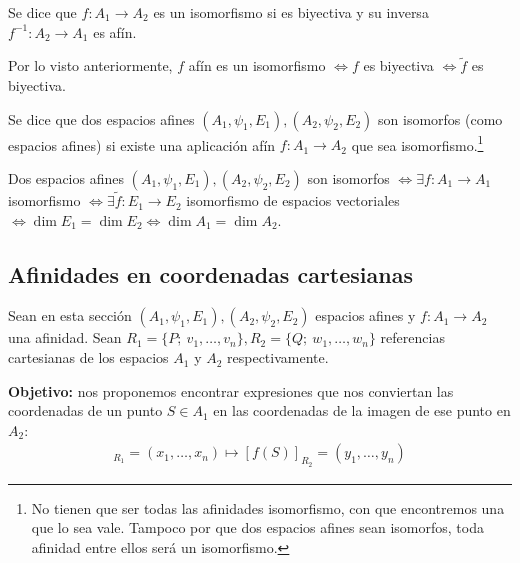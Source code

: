 \documentclass[14pt]{book}
\begin{document}
\begin{dfn}
	Se dice que $f : A_1 \to A_2$ es un isomorfismo si es biyectiva y su inversa $f^{-1} : A_2 \to A_1$ es afín.
\end{dfn}

\begin{tm}
	Por lo visto anteriormente, $f$ afín es un isomorfismo $\iff f$ es biyectiva $\iff \tilde{f}$ es biyectiva.
\end{tm}

\begin{dfn}
	Se dice que dos espacios afines $(A_1, \psi_1, E_1), (A_2, \psi_2, E_2)$ son isomorfos (como espacios afines) si existe una aplicación afín $f: A_1 \to A_2$ que sea isomorfismo.\footnote{No tienen que ser todas las afinidades isomorfismo, con que encontremos una que lo sea vale. Tampoco por que dos espacios afines sean isomorfos, toda afinidad entre ellos será un isomorfismo.}
\end{dfn}

\begin{tm}
	Dos espacios afines $(A_1, \psi_1, E_1), (A_2, \psi_2, E_2)$ son isomorfos $\iff \exists f : A_1 \to A_1$ isomorfismo $\iff \exists \tilde{f} : E_1 \to E_2$ isomorfismo de espacios vectoriales $\iff \dim E_1 = \dim E_2 \iff \dim A_1 = \dim A_2$.
\end{tm}

\subsection{Afinidades en coordenadas cartesianas}
Sean en esta sección $(A_1, \psi_1, E_1), (A_2, \psi_2, E_2)$ espacios afines y $f : A_1 \to A_2$ una afinidad. Sean $R_1 = \{P;\ v_1, \dots, v_n\}, R_2 = \{Q;\ w_1, \dots, w_n\}$ referencias cartesianas de los espacios $A_1$ y $A_2$ respectivamente.

\textbf{Objetivo:} nos proponemos encontrar expresiones que nos conviertan las coordenadas de un punto $S \in A_1$ en las coordenadas de la imagen de ese punto en $A_2$:
\begin{align*}
	[S]_{R_1} = (x_1, \dots, x_n) \longmapsto [f(S)]_{R_2} = (y_1, \dots, y_n)
\end{align*}
\end{document}
